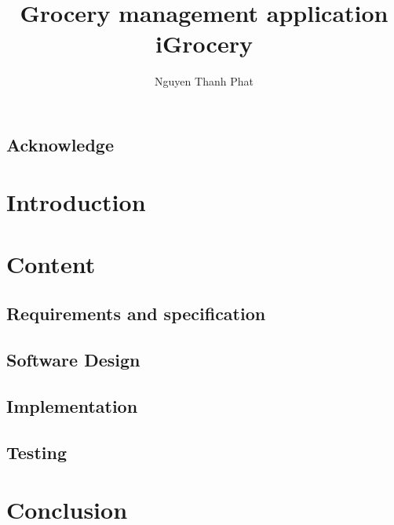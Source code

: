 \documentclass[a4paper,12pt,oneside]{report}
\title{Grocery management application iGrocery}  	%
\author{Nguyen Thanh Phat}							%
\begin{document}


\chapter*{Acknowledge}


\tableofcontents
\listoffigures
\listoftables

\clearpage
{}			%



\part{Introduction}


\part{Content}
\chapter{Requirements and specification}


\chapter{Software Design}


\chapter{Implementation}


\chapter{Testing}


\part{Conclusion}

{}


  
\end{document}
